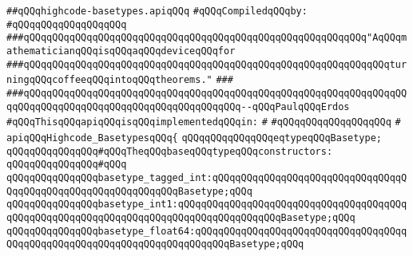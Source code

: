 \label{src/lib/compiler/back/top/highcode/highcode-basetypes.api}
\verb|##qQQqhighcode-basetypes.apiqQQq|\newline
\newline
\verb|#qQQqCompiledqQQqby:|\newline
\verb|#qQQqqQQqqQQqqQQqqQQq|\newline
\newline
\newline
\newline
\verb|###qQQqqQQqqQQqqQQqqQQqqQQqqQQqqQQqqQQqqQQqqQQqqQQqqQQqqQQqqQQq"AqQQqmathematicianqQQqisqQQqaqQQqdeviceqQQqfor|\newline
\verb|###qQQqqQQqqQQqqQQqqQQqqQQqqQQqqQQqqQQqqQQqqQQqqQQqqQQqqQQqqQQqqQQqturningqQQqcoffeeqQQqintoqQQqtheorems."|\newline
\verb|###|\newline
\verb|###qQQqqQQqqQQqqQQqqQQqqQQqqQQqqQQqqQQqqQQqqQQqqQQqqQQqqQQqqQQqqQQqqQQqqQQqqQQqqQQqqQQqqQQqqQQqqQQqqQQqqQQqqQQq--qQQqPaulqQQqErdos|\newline
\newline
\newline
\verb|#qQQqThisqQQqapiqQQqisqQQqimplementedqQQqin:|\newline
\verb|#|\newline
\verb|#qQQqqQQqqQQqqQQqqQQq|\newline
\verb|#|\newline
\verb|apiqQQqHighcode_BasetypesqQQq{|\newline
\newline
\verb|qQQqqQQqqQQqqQQqeqtypeqQQqBasetype;|\newline
\newline
\verb|qQQqqQQqqQQqqQQq#qQQqTheqQQqbaseqQQqtypeqQQqconstructors:|\newline
\verb|qQQqqQQqqQQqqQQq#qQQq|\newline
\verb|qQQqqQQqqQQqqQQqbasetype_tagged_int:qQQqqQQqqQQqqQQqqQQqqQQqqQQqqQQqqQQqqQQqqQQqqQQqqQQqqQQqqQQqqQQqBasetype;qQQq|\newline
\verb|qQQqqQQqqQQqqQQqbasetype_int1:qQQqqQQqqQQqqQQqqQQqqQQqqQQqqQQqqQQqqQQqqQQqqQQqqQQqqQQqqQQqqQQqqQQqqQQqqQQqqQQqqQQqqQQqBasetype;qQQq|\newline
\verb|qQQqqQQqqQQqqQQqbasetype_float64:qQQqqQQqqQQqqQQqqQQqqQQqqQQqqQQqqQQqqQQqqQQqqQQqqQQqqQQqqQQqqQQqqQQqqQQqqQQqBasetype;qQQq|\newline
